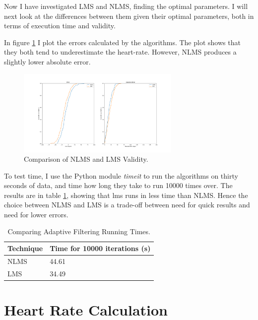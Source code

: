 \documentclass[12pt,a4paper,twoside,openright]{report}
\begin{document}
Now I have investigated LMS and NLMS, finding the optimal parameters. I
will next look at the differences between them given their optimal
parameters, both in terms of execution time and validity.

In figure \ref{fig:lms-nlms-validity} I plot the errors calculated by the
algorithms. The plot shows that they both tend to underestimate the
heart-rate. However, NLMS produces a slightly lower absolute error. 

\begin{figure}[tbh]
	\centerline{\includegraphics[width=0.7\textwidth]{figs/nlms-lms-validity.png}}
	\caption{Comparison of NLMS and LMS Validity.}
	\label{fig:lms-nlms-validity}
\end{figure}

To test time, I use the Python module \emph{timeit} to run the algorithms on
thirty seconds of data, and time how long they take to run 10000 times over.
The results are in table \ref{table:lms-nlms-time}, showing that lms runs in
less time than NLMS. Hence the choice between NLMS and LMS is a trade-off
between need for quick results and need for lower errors.

\begin{table}[tbh]
\centering
\caption{Comparing Adaptive Filtering Running Times.}
\label{table:lms-nlms-time}
\begin{tabular}{|l|l|}
\hline
Technique               & Time for 10000 iterations (s) \\ \hline
NLMS                    & 44.61                         \\
LMS                     & 34.49                         \\
\hline
\end{tabular}
\end{table}


\section{Heart Rate Calculation}
\end{document}
